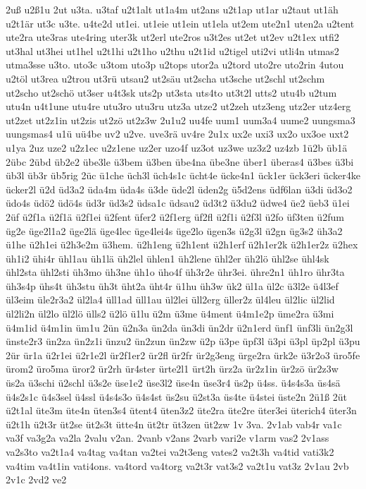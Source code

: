 {2uß
u2ß1u
2ut
u3ta.
u3taf
u2t1alt
ut1a4m
ut2ans
u2t1ap
ut1ar
u2taut
ut1äh
u2t1är
ut3c
u3te.
u4te2d
ut1ei.
ut1eie
ut1ein
ut1ela
ut2em
ute2n1
uten2a
u2tent
ute2ra
ute3ras
ute4ring
uter3k
ut2erl
ute2ros
u3t2es
ut2et
ut2ev
u2t1ex
utfi2
ut3hal
ut3hei
ut1hel
u2t1hi
u2t1ho
u2thu
u2t1id
u2tigel
uti2vi
utli4n
utmas2
utma3sse
u3to.
uto3c
u3tom
uto3p
u2tops
utor2a
u2tord
uto2re
uto2rin
4utou
u2töl
ut3rea
u2trou
ut3rü
utsau2
ut2säu
ut2scha
ut3sche
ut2schl
ut2schm
ut2scho
ut2schö
ut3ser
u4t3sk
uts2p
ut3sta
uts4to
ut3t2l
utts2
utu4b
u2tum
utu4n
u4t1une
utu4re
utu3ro
utu3ru
utz3a
utze2
ut2zeh
utz3eng
utz2er
utz4erg
ut2zet
ut2z1in
ut2zis
ut2zö
ut2z3w
2u1u2
uu4fe
uum1
uum3a4
uume2
uungsma3
uungsmas4
u1ü
uü4be
uv2
u2ve.
uve3rä
uv4re
2u1x
ux2e
uxi3
ux2o
ux3oe
uxt2
u1ya
2uz
uze2
u2z1ec
u2z1ene
uz2er
uzo4f
uz3ot
uz3we
uz3z2
uz4zb
1ü2b
üb1ä
2übc
2übd
üb2e2
übe3le
ü3bem
ü3ben
übe4na
übe3ne
über1
überas4
ü3bes
ü3bi
üb3l
üb3r
üb5rig
2üc
ü1che
üch3l
üch4s1c
ücht4e
ücke4n1
ück1er
ück3eri
ücker4ke
ücker2l
ü2d
üd3a2
üda4m
üda4s
ü3de
üde2l
üden2g
ü5d2ens
üdf6lan
ü3di
üd3o2
üdo4s
üdö2
üdö4s
üd3r
üd3s2
üdsa1c
üdsau2
üd3t2
ü3du2
üdwe4
üe2
üeb3
ü1ei
2üf
ü2f1a
ü2f1ä
ü2f1ei
ü2fent
üfer2
ü2f1erg
üf2fl
ü2f1i
ü2f3l
ü2fo
üf3ten
ü2fum
üg2e
üge2l1a2
üge2lä
üge4lec
üge4lei4s
üge2lo
ügen3s
ü2g3l
ü2gn
üg3s2
üh3a2
ü1he
ü2h1ei
ü2h3e2m
ü3hem.
ü2h1eng
ü2h1ent
ü2h1erf
ü2h1er2k
ü2h1er2z
ü2hex
üh1i2
ühi4r
ühl1au
üh1lä
üh2lel
ühlen1
üh2lene
ühl2er
üh2lö
ühl2se
ühl4sk
ühl2sta
ühl2sti
üh3mo
üh3ne
üh1o
üho4f
üh3r2e
ühr3ei.
ühre2n1
üh1ro
ühr3ta
üh3s4p
ühs4t
üh3stu
üh3t
üht2a
üht4r
ü1hu
üh3w
ük2
ül1a
ül2c
ü3l2e
ü4l3ef
ül3eim
üle2r3a2
ül2la4
üll1ad
üll1au
ül2lei
üll2erg
üller2z
ül4leu
ül2lic
ül2lid
ül2li2n
ül2lo
ül2lö
ülls2
ü2lö
ü1lu
ü2m
ü3me
ü4ment
ü4m1e2p
üme2ra
ü3mi
ü4m1id
ü4m1in
üm1u
2ün
ü2n3a
ün2da
ün3di
ün2dr
ü2n1erd
ünf1
ünf3li
ün2g3l
ünste2r3
ün2za
ün2z1i
ünzu2
ün2zun
ün2zw
ü2p
ü3pe
üpf3l
ü3pi
ü3pl
üp2pl
ü3pu
2ür
ür1a
ü2r1ei
ü2r1e2l
ür2f1er2
ür2fl
ür2fr
ür2g3eng
ürge2ra
ürk2e
ü3r2o3
üro5fe
ürom2
üro5ma
üror2
ür2rh
ür4ster
ürte2l1
ürt2h
ürz2a
ür2z1in
ür2zö
ür2z3w
üs2a
ü3schi
ü2schl
ü3s2e
üse1e2
üse3l2
üse4n
üse3r4
üs2p
ü4ss.
ü4s4s3a
üs4sä
ü4s2s1c
ü4s3sel
ü4ssl
ü4s4s3o
ü4s4st
üs2su
ü2st3a
üs4te
ü4stei
üste2n
2ü1ß
2üt
ü2t1al
üte3m
üte4n
üten3s4
ütent4
üten3z2
üte2ra
üte2re
üter3ei
üterich4
üter3n
ü2t1h
ü2t3r
üt2se
üt2s3t
ütte4n
üt2tr
üt3zen
üt2zw
1v
3va.
2v1ab
vab4r
va1c
va3f
va3g2a
va2la
2valu
v2an.
2vanb
v2ans
2varb
vari2e
v1arm
vas2
2v1ass
va2s3to
va2t1a4
va4tag
va4tan
va2tei
va2t3eng
vates2
va2t3h
va4tid
vati3k2
va4tim
va4t1in
vati4ons.
va4tord
va4torg
va2t3r
vat3s2
va2t1u
vat3z
2v1au
2vb
2v1c
2vd2
ve2
}

